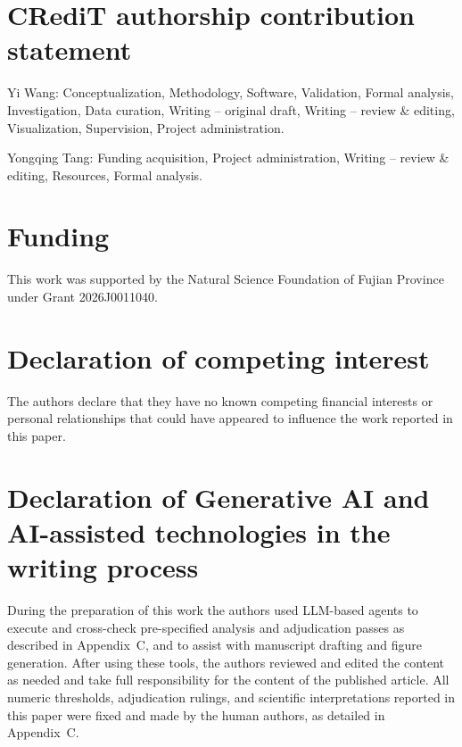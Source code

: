 \documentclass[preprint,12pt]{elsarticle}
\begin{document}
\linenumbers









\section*{CRediT authorship contribution statement}
Yi Wang: Conceptualization, Methodology, Software, Validation, Formal analysis, Investigation, Data curation, Writing -- original draft, Writing -- review \& editing, Visualization, Supervision, Project administration.

Yongqing Tang: Funding acquisition, Project administration, Writing -- review \& editing, Resources, Formal analysis.

\section*{Funding}
This work was supported by the Natural Science Foundation of Fujian Province under Grant 2026J0011040.

\section*{Declaration of competing interest}
The authors declare that they have no known competing financial interests or personal relationships that could have appeared to influence the work reported in this paper.

\section*{Declaration of Generative AI and AI-assisted technologies in the writing process}
During the preparation of this work the authors used LLM-based agents to execute and cross-check pre-specified analysis and adjudication passes as described in Appendix~C, and to assist with manuscript drafting and figure generation. After using these tools, the authors reviewed and edited the content as needed and take full responsibility for the content of the published article. All numeric thresholds, adjudication rulings, and scientific interpretations reported in this paper were fixed and made by the human authors, as detailed in Appendix~C.
\end{document}
